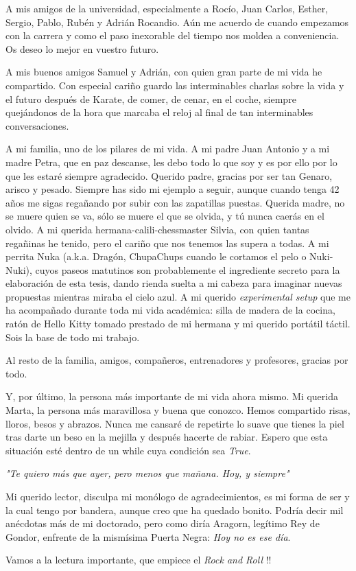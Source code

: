 A mis amigos de la universidad, especialmente a Rocío, Juan Carlos, Esther, Sergio, Pablo, Rubén y Adrián Rocandio. Aún me acuerdo de cuando empezamos con la carrera y como el paso inexorable del tiempo nos moldea a conveniencia. Os deseo lo mejor en vuestro futuro. 

A mis buenos amigos Samuel y Adrián, con quien gran parte de mi vida he compartido. Con especial cariño guardo las interminables charlas sobre la vida y el futuro después de Karate, de comer, de cenar, en el coche, siempre quejándonos de la hora que marcaba el reloj al final de tan interminables conversaciones. 

A mi familia, uno de los pilares de mi vida. A mi padre Juan Antonio y a mi madre Petra, que en paz descanse, les debo todo lo que soy y es por ello por lo que les estaré siempre agradecido. Querido padre, gracias por ser tan Genaro, arisco y pesado. Siempre has sido mi ejemplo a seguir, aunque cuando tenga 42 años me sigas regañando por subir con las zapatillas puestas. Querida madre, no se muere quien se va, sólo se muere el que se olvida, y tú nunca caerás en el olvido. A mi querida hermana-calili-chessmaster Silvia, con quien tantas regañinas he tenido, pero el cariño que nos tenemos las supera a todas. A mi perrita Nuka (a.k.a. Dragón, ChupaChups cuando le cortamos el pelo o Nuki-Nuki), cuyos paseos matutinos son probablemente el ingrediente secreto para la elaboración de esta tesis, dando rienda suelta a mi cabeza para imaginar nuevas propuestas mientras miraba el cielo azul. A mi querido \textit{experimental setup} que me ha acompañado durante toda mi vida académica: silla de madera de la cocina, ratón de Hello Kitty tomado prestado de mi hermana y mi querido portátil táctil. Sois la base de todo mi trabajo. 

Al resto de la familia, amigos, compañeros, entrenadores y profesores, gracias por todo.

Y, por último, la persona más importante de mi vida ahora mismo. Mi querida Marta, la persona más maravillosa y buena que conozco. Hemos compartido risas, lloros, besos y abrazos. Nunca me cansaré de repetirte lo suave que tienes la piel tras darte un beso en la mejilla y después hacerte de rabiar. Espero que esta situación esté dentro de un while cuya condición sea \textit{True}. 

\begin{center}
\textit{"Te quiero más que ayer, pero menos que mañana. Hoy, y siempre"}
\end{center}

Mi querido lector, disculpa mi monólogo de agradecimientos, es mi forma de ser y la cual tengo por bandera, aunque creo que ha quedado bonito. Podría decir mil anécdotas más de mi doctorado, pero como diría Aragorn, legítimo Rey de Gondor, enfrente de la mismísima Puerta Negra: \textit{Hoy no es ese día}. 

Vamos a la lectura importante, que empiece el \textit{Rock and Roll} !!


